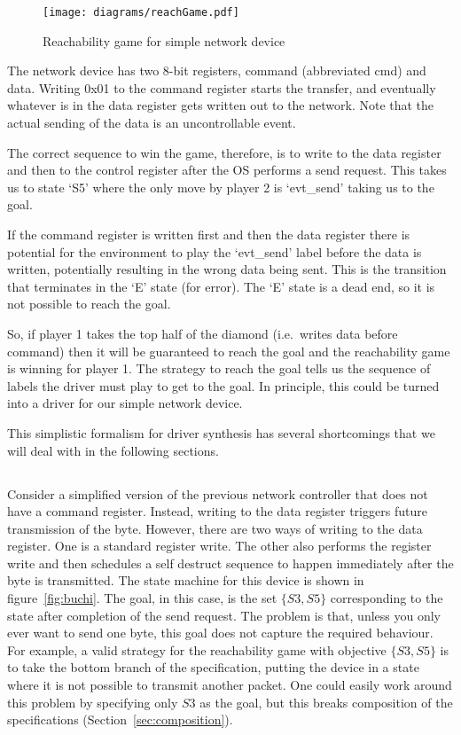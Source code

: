 \begin{figure}
\centering
\texttt{[image: diagrams/reachGame.pdf]}
\caption{Reachability game for simple network device}
\label{fig:reach}
\end{figure}

The network device has two 8-bit registers, command (abbreviated cmd) and data. Writing 0x01 to the command register starts the transfer, and eventually whatever is in the data register gets written out to the network. Note that the actual sending of the data is an uncontrollable event. 

The correct sequence to win the game, therefore, is to write to the data register and then to the control register after the OS performs a send request. This takes us to state `S5' where the only move by player 2 is `evt\_send' taking us to the goal. 

If the command register is written first and then the data register there is potential for the environment to play the `evt\_send' label before the data is written, potentially resulting in the wrong data being sent. This is the transition that terminates in the `E' state (for error). The `E' state is a dead end, so it is not possible to reach the goal. 

So, if player 1 takes the top half of the diamond (i.e.\ writes data before command) then it will be guaranteed to reach the goal and the reachability game is winning for player 1. The strategy to reach the goal tells us the sequence of labels the driver must play to get to the goal. In principle, this could be turned into a driver for our simple network device.

This simplistic formalism for driver synthesis has several shortcomings that we will deal with in the following sections.

\subsection{\buchi}

Consider a simplified version of the previous network controller that does not have a command register. Instead, writing to the data register triggers future transmission of the byte. However, there are two ways of writing to the data register. One is a standard register write. The other also performs the register write and then schedules a self destruct sequence to happen immediately after the byte is transmitted. The state machine for this device is shown in figure~\ref{fig:buchi}. The goal, in this case, is the set $\{S3, S5\}$ corresponding to the state after completion of the send request. The problem is that, unless you only ever want to send one byte, this goal does not capture the required behaviour. For example, a valid strategy for the reachability game with objective $\{S3, S5\}$ is to take the bottom branch of the specification, putting the device in a state where it is not possible to transmit another packet. One could easily work around this problem by specifying only ${S3}$ as the goal, but this breaks composition of the specifications (Section~\ref{sec:composition}).


